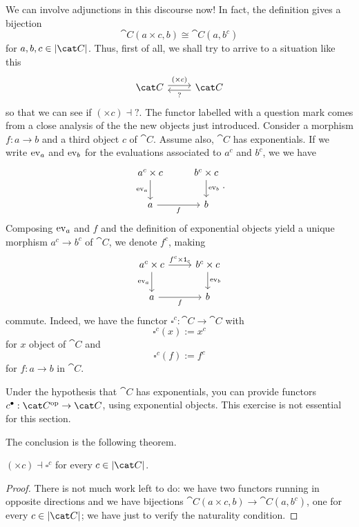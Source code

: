 We can involve adjunctions in this discourse now! In fact, the definition gives a bijection
\[\cat C(a \times c, b) \cong \cat C\left(a, b^c\right)\]
for \(a, b, c \in \obj{\cat C}\). Thus, first of all, we shall try to arrive to a situation like this
\[\begin{tikzcd}
\cat C \ar["{(\times c)}", r, shift left] & \cat C \ar["?", l, shift left]
\end{tikzcd}\]
so that we can see if \((\times c) \dashv ?\).\newline
The functor labelled with a question mark comes from a close analysis of the the new objects just introduced. Consider a morphism \(f : a \to b\) and a third object \(c\) of \(\cat C\). Assume also, \(\cat C\) has exponentials. If we write \(\operatorname{ev}_a\) and \(\operatorname{ev}_b\) for the evaluations associated to \(a^c\) and \(b^c\), we we have
\[\begin{tikzcd}
a^c \times c \ar["{\ev_a}", d, swap] & b^c \times c \ar["{\ev_b}", d] \\
a \ar["f", r, swap] & b
\end{tikzcd} .\]
Composing \(\operatorname{ev}_a\) and \(f\) and the definition of exponential objects yield a unique morphism \(a^c \to b^c\) of \(\cat C\), we denote \(f^c\), making
\[\begin{tikzcd}
a^c \times c \ar["{\ev_a}", d, swap] \ar["{f^c \times \id_c}", r] & b^c \times c \ar["{\ev_b}", d] \\
a \ar["f", r, swap] & b
\end{tikzcd}\]
commute. Indeed, we have the functor \(\square^c : \cat C \to \cat C\) with
\[\square^c (x) := x^c\]
for \(x\) object of \(\cat C\) and
\[\square^c (f) := f^c\]
for \(f : a \to b\) in \(\cat C\).

\begin{exercise}
Under the hypothesis that \(\cat C\) has exponentials, you can provide functors \(c^\bullet : \opcat C \to \cat C\), using exponential objects. This exercise is not essential for this section.
\end{exercise}

The conclusion is the following theorem.

\begin{proposition}
\((\times c) \dashv \square^c\) for every \(c \in \obj{\cat C}\).
\end{proposition}

\begin{proof}
There is not much work left to do: we have two functors running in opposite directions and we have bijections \(\cat C(a \times c, b) \to \cat C\left(a, b^c\right)\), one for every \(c \in \obj{\cat C}\); we have just to verify the naturality condition.
\end{proof}

